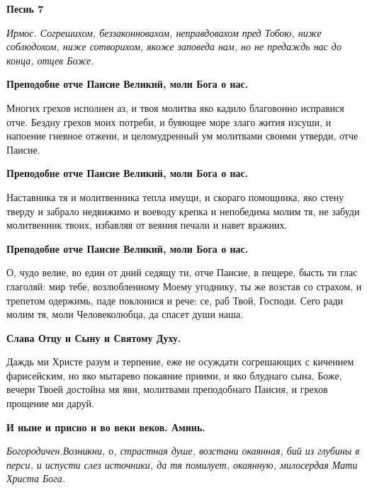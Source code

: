\bfseries Песнь 7\normalfont{} 




\itshape Ирмос\normalfont{}. Согрешихом, беззаконновахом, неправдовахом пред Тобою, ниже соблюдохом, ниже сотворихом, якоже заповеда нам, но не предаждь нас до конца, отцев Боже. 




\bfseries Преподобне отче Паисие Великий, моли Бога о нас.\normalfont{} 




Многих грехов исполнен аз, и твоя молитва яко кадило благовонно исправися отче. Бездну грехов моих потреби, и буяющее море злаго жития изсуши, и напоение гневное отжени, и целомудренный ум молитвами своими утверди, отче Паисие. 




\bfseries Преподобне отче Паисие Великий, моли Бога о нас.\normalfont{}\nopagebreak


Наставника тя и молитвенника тепла имущи, и скораго помощника, яко стену тверду и забрало недвижимо и воеводу крепка и непобедима молим тя, не забуди молитвенник твоих, избавляя от веяния печали и навет вражиих. 




\bfseries Преподобне отче Паисие Великий, моли Бога о нас.\normalfont{}\nopagebreak


О, чудо велие, во един от дний седящу ти, отче Паисие, в пещере, бысть ти глас глаголяй: мир тебе, возлюбленному Моему угоднику, ты же возстав со страхом, и трепетом одержимь, паде поклонися и рече: се, раб Твой, Господи. Сего ради молим тя, моли Человеколюбца, да спасет души наша. 




\bfseries Слава Отцу и Сыну и Святому Духу\normalfont{}. 




Даждь ми Христе разум и терпение, еже не осуждати согрешающих с кичением фарисейским, но яко мытарево покаяние приими, и яко блуднаго сына, Боже, вечери Твоей достойна мя яви, молитвами преподобнаго Паисия, и грехов прощение ми даруй.




\bfseries И ныне и присно и во веки веков. Аминь\normalfont{}. 




\itshape Богородичен.\normalfont{}Возникни, о, страстная душе, возстани окаянная, бий из глубины в перси, и испусти слез источники, да тя помилует, окаянную, милосердая Мати Христа Бога. 




